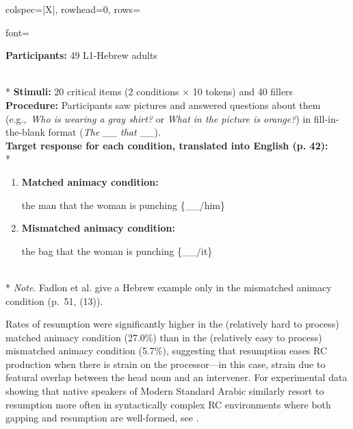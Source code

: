 \begin{longtblr}[caption={\textcite{fadlon.etal2019}: Written RC elicitation task in Experiment 3}, label={tblr:fadlon}]{colspec={|X|}, rowhead=0, rows={font=\raggedright{}}}\hline
\textbf{Participants:} 49 L1-Hebrew adults \vspace{5pt}\rule{0pt}{10pt}\\*
\textbf{Stimuli:} 20 critical items (2 conditions × 10 tokens) and 40 fillers \vspace{5pt}\\
\textbf{Procedure:} Participants saw pictures and answered questions about them (e.g.,~\textit{Who is wearing a gray shirt?} or \textit{What in the picture is orange?}) in fill-in-the-blank format (\textit{The \_\_ that \_\_}). \vspace{5pt}\\
\textbf{Target response for each condition, translated into English (p. 42):} \vspace{5pt}\\*
\begin{varwidth}{\linewidth}\begin{enumerate}[\bfseries (a),itemsep=5pt] 
\item \textbf{Matched animacy condition:}\par\nobreak
the man that the woman is punching \{\_\_/him\}
\item \textbf{Mismatched animacy condition:}\par\nobreak
the bag that the woman is punching \{\_\_/it\}
\end{enumerate}\end{varwidth}\vspace{5pt}\\*
\textit{Note}. Fadlon et al. give a Hebrew example only in the mismatched animacy condition (p.~51, (13)). \\\hline
\end{longtblr}

\noindent Rates of resumption were significantly higher in the (relatively hard to process) matched animacy condition (27.0\%) than in the (relatively easy to process) mismatched animacy condition (5.7\%), suggesting that resumption eases RC production when there is strain on the processor---in this case, strain due to featural overlap between the head noun and an intervener. For experimental data showing that native speakers of Modern Standard Arabic similarly resort to resumption more often in syntactically complex RC environments where both gapping and resumption are well-formed, see \textcite{tucker.etal2019}.

